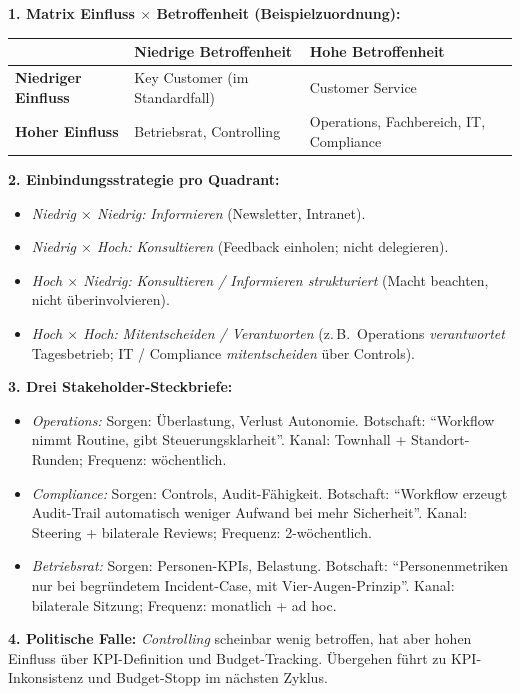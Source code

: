 \documentclass[11pt,a4paper,oneside]{article}
\begin{document}
\begin{loesungbox}
\textbf{1. Matrix Einfluss $\times$ Betroffenheit (Beispielzuordnung):}

\smallskip
\begin{tabularx}{\linewidth}{@{}p{3.4cm}p{4.6cm}X@{}}
\toprule
 & \textbf{Niedrige Betroffenheit} & \textbf{Hohe Betroffenheit} \\
\midrule
\textbf{Niedriger Einfluss} & Key Customer (im Standardfall)          & Customer Service \\
\textbf{Hoher Einfluss}     & Betriebsrat, Controlling                 & Operations, Fachbereich, IT, Compliance \\
\bottomrule
\end{tabularx}

\smallskip
\textbf{2. Einbindungsstrategie pro Quadrant:}
\begin{itemize}
  \item \emph{Niedrig $\times$ Niedrig:} \emph{Informieren} (Newsletter, Intranet).
  \item \emph{Niedrig $\times$ Hoch:} \emph{Konsultieren} (Feedback einholen; nicht delegieren).
  \item \emph{Hoch $\times$ Niedrig:} \emph{Konsultieren / Informieren strukturiert} (Macht beachten, nicht \"uberinvolvieren).
  \item \emph{Hoch $\times$ Hoch:} \emph{Mitentscheiden / Verantworten} (z.\,B.\ Operations \emph{verantwortet} Tagesbetrieb; IT / Compliance \emph{mitentscheiden} \"uber Controls).
\end{itemize}

\smallskip
\textbf{3. Drei Stakeholder-Steckbriefe:}
\begin{itemize}
  \item \emph{Operations:} Sorgen: \"Uberlastung, Verlust Autonomie. Botschaft: ``Workflow nimmt Routine, gibt Steuerungsklarheit''. Kanal: Townhall + Standort-Runden; Frequenz: w\"ochentlich.
  \item \emph{Compliance:} Sorgen: Controls, Audit-F\"ahigkeit. Botschaft: ``Workflow erzeugt Audit-Trail automatisch \textendash{} weniger Aufwand bei mehr Sicherheit''. Kanal: Steering + bilaterale Reviews; Frequenz: 2-w\"ochentlich.
  \item \emph{Betriebsrat:} Sorgen: Personen-KPIs, Belastung. Botschaft: ``Personenmetriken nur bei begr\"undetem Incident-Case, mit Vier-Augen-Prinzip''. Kanal: bilaterale Sitzung; Frequenz: monatlich + ad hoc.
\end{itemize}

\smallskip
\textbf{4. Politische Falle:} \emph{Controlling} \textendash{} scheinbar wenig betroffen, hat aber hohen Einfluss \"uber KPI-Definition und Budget-Tracking. \"Ubergehen f\"uhrt zu KPI-Inkonsistenz und Budget-Stopp im n\"achsten Zyklus.
\end{loesungbox}
\end{document}
